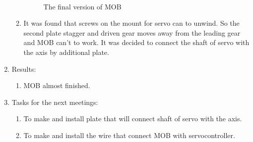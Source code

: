 \begin{enumerate}
\begin{enumerate}
\begin{figure}[H]
\begin{minipage}[h]{0.47\linewidth}
      	\end{minipage}
      	\vfill
      	\begin{minipage}[h]{0.2\linewidth}
      		\center  
      	\end{minipage}
      	\begin{minipage}[h]{0.6\linewidth}
      		\caption{The final version of MOB}
      	\end{minipage}
      \end{figure}
      	      
      \item It was found that screws on the mount for servo can to unwind. So the second plate stagger and driven gear moves away from the leading gear and MOB can't to work. It was decided to connect the shaft of servo with the axis by additional plate.
      
 	\end{enumerate}
 	\item Results:
 	\begin{enumerate}
 		
 	  \item MOB almost finished.
 				
 	\end{enumerate}
 	\item Tasks for the next meetings:
 	\begin{enumerate}
 		
 	  \item To make and install plate that will connect shaft of servo with the axis.
 				
 	  \item To make and install the wire that connect MOB with servocontroller.
 				
 	\end{enumerate}
\end{enumerate}
\fillpage